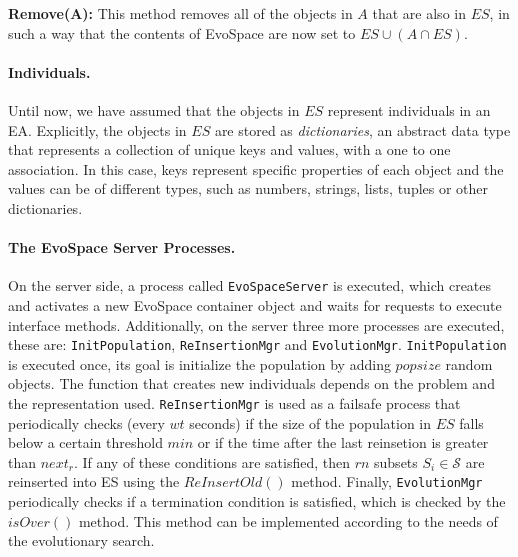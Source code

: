 \documentclass{llncs}
\begin{document}
\textbf{Remove(A):} This method removes all of the objects in $A$ that are also in $ES$, in such a way that
  the contents of EvoSpace are now set to $ES \cup (A\cap ES)$.


\paragraph{Individuals.}
Until now, we have assumed that the objects in $ES$ represent individuals in an EA.
Explicitly, the objects in $ES$ are stored as \emph{dictionaries}, an abstract data type that represents a collection
of unique keys and values, with a one to one association.
In this case, keys represent specific properties of each object and the values can be of different types, such as
numbers, strings, lists, tuples or other dictionaries.


\paragraph{The EvoSpace Server Processes.}
On the server side, a process called \texttt{EvoSpaceServer} is executed, which creates and activates a new EvoSpace
container object and waits for requests to execute interface methods.
Additionally, on the server three more processes are executed, these are: \texttt{InitPopulation}, \texttt{ReInsertionMgr} and \texttt{EvolutionMgr}.
\texttt{InitPopulation} is executed once, its goal is initialize the population by adding $popsize$ random
objects. The function that creates new individuals depends on the problem and the representation used.
\texttt{ReInsertionMgr} is used as a failsafe process that periodically checks (every $wt$ seconds) if the size of the population in $ES$
falls below a certain threshold $min$ or if the time after the last reinsetion is greater than $next_r$.
If any of these conditions are satisfied, then $rn$ subsets $S_i \in \mathcal{S}$ are reinserted into ES using the $ReInsertOld()$ method.
Finally, \texttt{EvolutionMgr} periodically checks if a termination condition is satisfied, which is checked by the $isOver()$ method.
This method can be implemented according to the needs of the evolutionary search.
\end{document}
